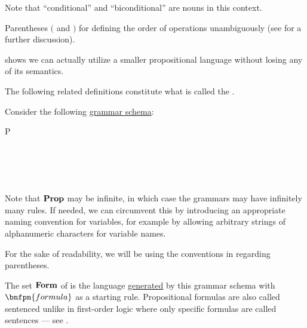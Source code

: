 \begin{definition}
\begin{thmenum}
     Note that \enquote{conditional} and \enquote{biconditional} are nouns in this context.

     Parentheses \( ( \) and \( ) \) for defining the order of operations unambiguously (see  for a further discussion).
  \end{thmenum}

   shows we can actually utilize a smaller propositional language without losing any of its semantics.
\end{definition}

\begin{definition}\label{def:propositional_syntax}
  The following related definitions constitute what is called the .

  \begin{thmenum}
     Consider the following \hyperref[ex:natural_number_arithmetic_grammar/backus_naur_form]{grammar schema}:
    \begin{bnf*}
         {P \in {}} \\
       {\circ \in \Sigma} \\
          { \bnfor} \\
      \bnfmore             {\bnfts{\( \top \)} \bnfor \bnfts{\( \bot \)} \bnfor} \\
       \\
    \end{bnf*}

    Note that \( \operatorname{\mathbf{Prop}} \) may be infinite, in which case the grammars may have infinitely many rules. If needed, we can circumvent this by introducing an appropriate naming convention for variables, for example by allowing arbitrary strings of alphanumeric characters for variable names.

    For the sake of readability, we will be using the conventions in  regarding parentheses.

     The set \( \operatorname{\mathbf{Form}} \) of  is the language \hyperref[def:grammar_derivation/grammar_language]{generated} by this grammar schema with \( \bnfpn{formula} \) as a starting rule. Propositional formulas are also called sentenced unlike in first-order logic where only specific formulas are called sentences --- see .


\end{thmenum}
\end{definition}
